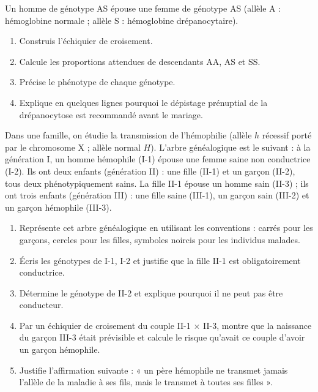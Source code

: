 \documentclass[11pt]{article}
\newcounter{popsec}
\newcounter{popsub}
\newcommand{\courssub}[1]{%
  \stepcounter{popsub}%
  \par\vspace{9pt}\noindent{\popxbold\fontsize{11.5}{13}\selectfont\color{popink}{\color{poporange}\thepopsec.\thepopsub}\hspace{6pt}#1}\par\nopagebreak\vspace{4pt}
}
\begin{document}
\begin{exercice}
Un homme de génotype AS épouse une femme de génotype AS (allèle A : hémoglobine normale ; allèle S : hémoglobine drépanocytaire).
\begin{enumerate}
\item Construis l'échiquier de croisement.
\item Calcule les proportions attendues de descendants AA, AS et SS.
\item Précise le phénotype de chaque génotype.
\item Explique en quelques lignes pourquoi le dépistage prénuptial de la drépanocytose est recommandé avant le mariage.
\end{enumerate}
\end{exercice}

\courssub{Je me prépare au Probatoire}

\begin{exercice}
Dans une famille, on étudie la transmission de l'hémophilie (allèle $h$ récessif porté par le chromosome X ; allèle normal $H$). L'arbre généalogique est le suivant : à la génération I, un homme hémophile (I-1) épouse une femme saine non conductrice (I-2). Ils ont deux enfants (génération II) : une fille (II-1) et un garçon (II-2), tous deux phénotypiquement sains. La fille II-1 épouse un homme sain (II-3) ; ils ont trois enfants (génération III) : une fille saine (III-1), un garçon sain (III-2) et un garçon hémophile (III-3).
\begin{enumerate}
\item Représente cet arbre généalogique en utilisant les conventions : carrés pour les garçons, cercles pour les filles, symboles noircis pour les individus malades.
\item Écris les génotypes de I-1, I-2 et justifie que la fille II-1 est obligatoirement conductrice.
\item Détermine le génotype de II-2 et explique pourquoi il ne peut pas être conducteur.
\item Par un échiquier de croisement du couple II-1 $\times$ II-3, montre que la naissance du garçon III-3 était prévisible et calcule le risque qu'avait ce couple d'avoir un garçon hémophile.
\item Justifie l'affirmation suivante : « un père hémophile ne transmet jamais l'allèle de la maladie à ses fils, mais le transmet à toutes ses filles ».
\end{enumerate}
\end{exercice}
\end{document}
